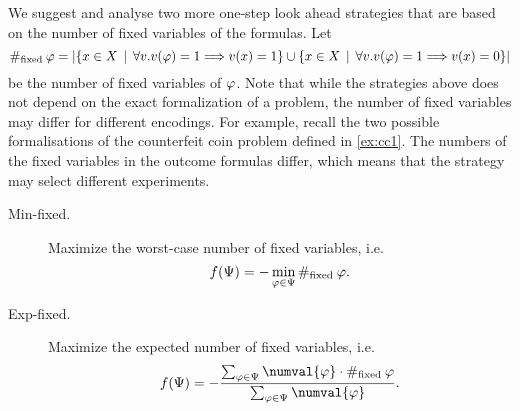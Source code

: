 \newcommand{\fixed}{\#_\textrm{fixed}\:}
We suggest and analyse two more one-step look ahead strategies that are based on
the number of fixed variables of the formulas.
Let
\[
\fixed\form = |\{ x\in\Var \| \forall v.v(\form)=1 ==> v(x)=1 \}
                  \cup\{ x\in\Var \| \forall v.v(\form)=1 ==> v(x)=0 \}|
\]
be the number of fixed variables of $\varphi$.
Note that while the strategies above does not depend on the exact
  formalization of a problem, the number of fixed variables may differ for
  different encodings.
For example, recall the two possible formalisations of the counterfeit coin problem defined in \autoref{ex:cc1}.
The numbers of the fixed variables in the outcome formulas differ, which
  means that the strategy may select different experiments.

\begin{description}
\item[Min-fixed.] Maximize the worst-case number of fixed variables, i.e.
\[
f(\formset) = -\min_{\form\in\formset} \fixed{\form}.
\]
\item[Exp-fixed.] Maximize the expected number of fixed variables, i.e.
\[
f(\formset) = -\frac{\sum_{\form\in\formset}\numval{\form}\cdot\fixed{\form}}{\sum_{\form\in\formset}\numval{\form}}.
\]
\end{description}
\pagebreak

